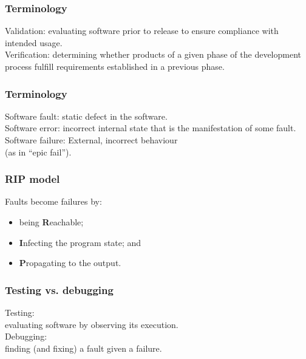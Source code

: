 \documentclass{beamer}
\newenvironment{changemargin}[1]{%
  \begin{list}{}{%
    \setlength{\topsep}{0pt}%
    \setlength{\leftmargin}{#1}%
    \setlength{\rightmargin}{1em}
    \setlength{\listparindent}{\parindent}%
    \setlength{\itemindent}{\parindent}%
    \setlength{\parsep}{\parskip}%
  }%
  \item[]}{\end{list}}
\begin{document}
\begin{frame}

  \frametitle{Terminology}
  
  \begin{changemargin}{2em}
\Large
\alert{Validation}: evaluating software prior to release to 
ensure compliance with intended usage.\\[1em]

\alert{Verification}: determining whether products of a given phase
of the development process fulfill requirements established in a 
previous phase.
  \end{changemargin}

\end{frame}

\begin{frame}

\frametitle{Terminology}
\Large

  \begin{changemargin}{2em}
\alert{Software fault}: static defect in the software.\\[1em]

\alert{Software error}: incorrect internal state that is the manifestation
of some fault.\\[1em]

\alert{Software failure}: External, incorrect behaviour \\ 
\hspace*{2em} (as in ``epic fail'').
  \end{changemargin}

\end{frame}

\begin{frame}

\frametitle{RIP model}
\Large
  \begin{changemargin}{2em}
    Faults become failures by:
    \begin{itemize}
      \item being {\bf R}eachable;
      \item {\bf I}nfecting the program state; and
      \item {\bf P}ropagating to the output.
    \end{itemize}
  \end{changemargin}

\end{frame}

\begin{frame}

\frametitle{Testing vs. debugging}
\Large
  \begin{changemargin}{1em}

\alert{Testing}: \\
\hspace*{1em} evaluating software by observing its execution.\\[1em]

\alert{Debugging}: \\
\hspace*{1em} finding (and fixing) a fault given a failure.
  \end{changemargin}

\end{frame}
\end{document}
